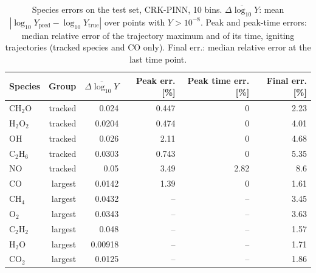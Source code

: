 \begin{table}[htbp]
    \centering
    \small
    \begin{tabular}{lrrrrr}
        \hline
        Species & Group & $\overline{\Delta\log_{10}Y}$ & Peak err. [\%] & Peak time err. [\%] & Final err. [\%] \\
        \hline
        $\mathrm{CH_{2}O}$ & tracked & 0.024 & 0.447 & 0 & 2.23 \\
        $\mathrm{H_{2}O_{2}}$ & tracked & 0.0204 & 0.474 & 0 & 4.01 \\
        $\mathrm{OH}$ & tracked & 0.026 & 2.11 & 0 & 4.68 \\
        $\mathrm{C_{2}H_{6}}$ & tracked & 0.0303 & 0.743 & 0 & 5.35 \\
        $\mathrm{NO}$ & tracked & 0.05 & 3.49 & 2.82 & 8.6 \\
        $\mathrm{CO}$ & largest & 0.0142 & 1.39 & 0 & 1.61 \\
        $\mathrm{CH_{4}}$ & largest & 0.0432 & -- & -- & 3.45 \\
        $\mathrm{O_{2}}$ & largest & 0.0343 & -- & -- & 3.63 \\
        $\mathrm{C_{2}H_{2}}$ & largest & 0.048 & -- & -- & 1.57 \\
        $\mathrm{H_{2}O}$ & largest & 0.00918 & -- & -- & 1.71 \\
        $\mathrm{CO_{2}}$ & largest & 0.0125 & -- & -- & 1.86 \\
        \hline
    \end{tabular}
    \caption{Species errors on the test set, CRK-PINN, 10 bins. $\overline{\Delta\log_{10}Y}$: mean $|\log_{10}Y_\mathrm{pred}-\log_{10}Y_\mathrm{true}|$ over points with $Y>10^{-8}$. Peak and peak-time errors: median relative error of the trajectory maximum and of its time, igniting trajectories (tracked species and CO only). Final err.: median relative error at the last time point.}
    \label{tab:species_crkpinn_predicted_b10_conv}
\end{table}
